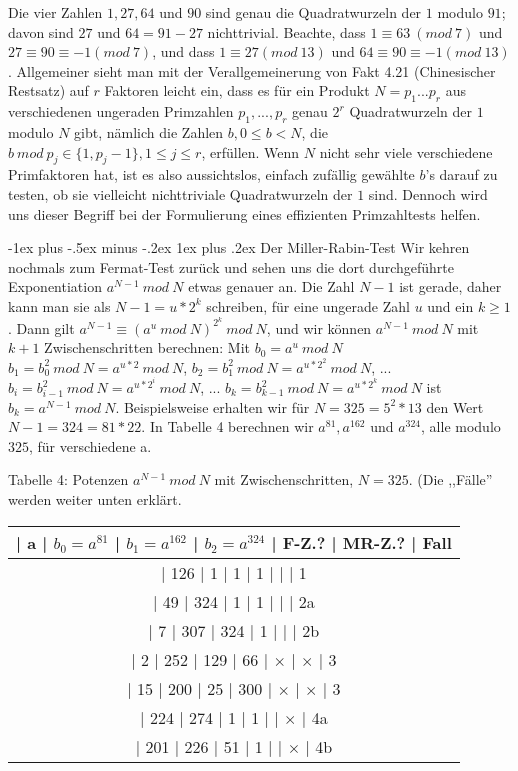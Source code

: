 \documentclass[a4paper]{article}
\makeatletter
\renewcommand{\subsubsection}{\@startsection{subsubsection}{3}{0mm}%
 {-1ex plus -.5ex minus -.2ex}%
 {1ex plus .2ex}%
 {\normalfont\small\bfseries}}
\makeatother
\begin{document}
\begin{multicols}{3}
        Die vier Zahlen $1, 27, 64$ und $90$ sind genau die Quadratwurzeln der $1$ modulo $91$; davon sind $27$ und $64 = 91-27$ nichttrivial. Beachte, dass $1\equiv 63\ (mod\ 7)$ und $27\equiv 90 \equiv -1(mod\ 7)$, und dass $1\equiv 27 (mod\ 13)$ und $64\equiv 90 \equiv -1 (mod\ 13)$. Allgemeiner sieht man mit der Verallgemeinerung von Fakt 4.21 (Chinesischer Restsatz) auf $r$ Faktoren leicht ein, dass es für ein Produkt $N=p_1...p_r$ aus verschiedenen ungeraden Primzahlen $p_1,...,p_r$ genau $2^r$ Quadratwurzeln der $1$ modulo $N$ gibt, nämlich die Zahlen $b,0\leq b < N$, die $b\ mod\ p_j\in\{1 ,p_j-1\}, 1\leq j\leq r$, erfüllen. Wenn $N$ nicht sehr viele verschiedene Primfaktoren hat, ist es also aussichtslos, einfach zufällig gewählte $b$’s darauf zu testen, ob sie vielleicht nichttriviale Quadratwurzeln der $1$ sind. Dennoch wird uns dieser Begriff bei der Formulierung eines effizienten Primzahltests helfen.

        \subsubsection{Der Miller-Rabin-Test}
        Wir kehren nochmals zum Fermat-Test zurück und sehen uns die dort durchgeführte Exponentiation $a^{N-1}\ mod\ N$ etwas genauer an. Die Zahl $N-1$ ist gerade, daher kann man sie als $N-1=u*2^k$ schreiben, für eine ungerade Zahl $u$ und ein $k\geq 1$. Dann gilt $a^{N-1} \equiv (a^u\ mod\ N)^{2^k}\ mod\ N$, und wir können $a^{N-1}\ mod\ N$ mit $k+1$ Zwischenschritten berechnen: Mit
    $b_0 =a^u\ mod\ N$
    $b_1 =b^2_0\ mod\ N=a^{u*2}\ mod\ N$,
    $b_2 =b^2_1\ mod\ N=a^{u*2^2}\ mod\ N$,
        ...
    $b_i=b^2_{i-1}\ mod\ N=a^{u*2^i}\ mod\ N$,
        ...
    $b_k=b^2_{k-1}\ mod\ N=a^{u*2^k}\ mod\ N$
        ist $b_k=a^{N-1}\ mod\ N$. Beispielsweise erhalten wir für $N=325 = 5^2 *13$ den Wert $N-1 = 324 = 81* 22$. In Tabelle 4 berechnen wir $a^{81} ,a^{162}$ und $a^{324}$, alle modulo $325$, für verschiedene a.

        Tabelle 4: Potenzen $a^{N-1}\ mod\ N$ mit Zwischenschritten, $N=325$. (Die ,,Fälle'' werden weiter unten erklärt.
        \begin{tabular}{c}
            | a  | $b_0 =a^{81}$ | $b_1=a^{162}$ | $b_2=a^{324}$ | F-Z.?  | MR-Z.?  | Fall \\\hline
            | 126 | 1       | 1       | 1       |     |     | 1                            \\
            | 49 | 324      | 1       | 1       |     |     | 2a                           \\
            | 7  | 307      | 324      | 1       |     |     | 2b                          \\
            | 2  | 252      | 129      | 66      | $\times$ | $\times$ | 3                 \\
            | 15 | 200      | 25      | 300      | $\times$ | $\times$ | 3                 \\
            | 224 | 274      | 1       | 1       |     | $\times$ | 4a                     \\
            | 201 | 226      | 51      | 1       |     | $\times$ | 4b
        \end{tabular}


\end{multicols}
\end{document}
